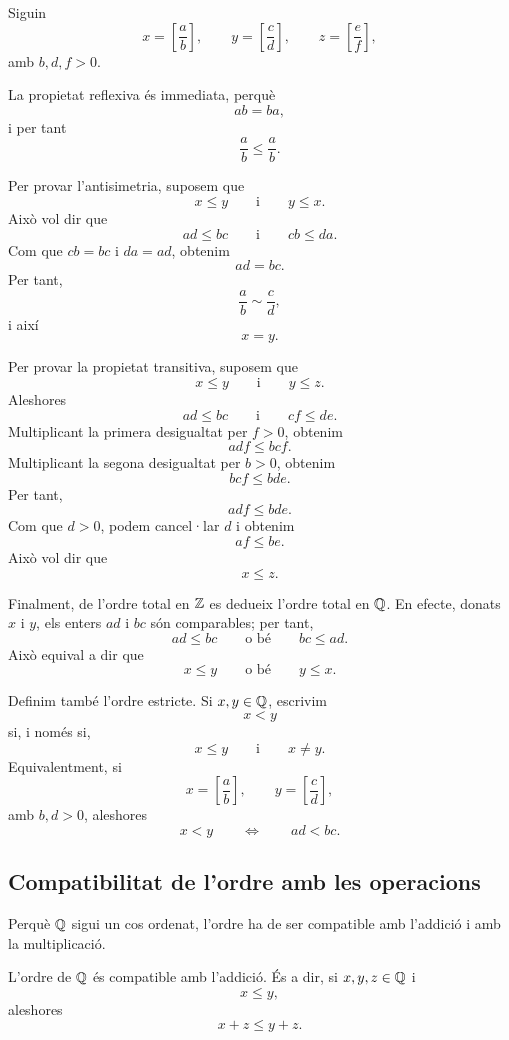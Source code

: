 \begin{prova}
Siguin
\[
	x=\left[\frac{a}{b}\right],
	\qquad
	y=\left[\frac{c}{d}\right],
	\qquad
	z=\left[\frac{e}{f}\right],
\]
amb \(b,d,f>0\).

La propietat reflexiva és immediata, perquè
\[
	ab=ba,
\]
i per tant
\[
	\frac{a}{b}\leq\frac{a}{b}.
\]

Per provar l'antisimetria, suposem que
\[
	x\leq y
	\qquad\text{i}\qquad
	y\leq x.
\]
Això vol dir que
\[
	ad\leq bc
	\qquad\text{i}\qquad
	cb\leq da.
\]
Com que \(cb=bc\) i \(da=ad\), obtenim
\[
	ad=bc.
\]
Per tant,
\[
	\frac{a}{b}\sim\frac{c}{d},
\]
i així
\[
	x=y.
\]

Per provar la propietat transitiva, suposem que
\[
	x\leq y
	\qquad\text{i}\qquad
	y\leq z.
\]
Aleshores
\[
	ad\leq bc
	\qquad\text{i}\qquad
	cf\leq de.
\]
Multiplicant la primera desigualtat per \(f>0\), obtenim
\[
	adf\leq bcf.
\]
Multiplicant la segona desigualtat per \(b>0\), obtenim
\[
	bcf\leq bde.
\]
Per tant,
\[
	adf\leq bde.
\]
Com que \(d>0\), podem cancel·lar \(d\) i obtenim
\[
	af\leq be.
\]
Això vol dir que
\[
	x\leq z.
\]

Finalment, de l'ordre total en \(\mathbb{Z}\) es dedueix l'ordre total en \(\mathbb{Q}\). En efecte, donats \(x\) i \(y\), els enters \(ad\) i \(bc\) són comparables; per tant,
\[
	ad\leq bc
	\qquad\text{o bé}\qquad
	bc\leq ad.
\]
Això equival a dir que
\[
	x\leq y
	\qquad\text{o bé}\qquad
	y\leq x.
\]
\end{prova}

Definim també l'ordre estricte. Si \(x,y\in\mathbb{Q}\), escrivim
\[
	x<y
\]
si, i només si,
\[
	x\leq y
	\qquad\text{i}\qquad
	x\neq y.
\]
Equivalentment, si
\[
	x=\left[\frac{a}{b}\right],
	\qquad
	y=\left[\frac{c}{d}\right],
\]
amb \(b,d>0\), aleshores
\[
	x<y
	\qquad\Longleftrightarrow\qquad
	ad<bc.
\]

\subsection{Compatibilitat de l'ordre amb les operacions}

Perquè \(\mathbb{Q}\) sigui un cos ordenat, l'ordre ha de ser compatible amb l'addició i amb la multiplicació.

\begin{proposicio}
L'ordre de \(\mathbb{Q}\) és compatible amb l'addició. És a dir, si \(x,y,z\in\mathbb{Q}\) i
\[
	x\leq y,
\]
aleshores
\[
	x+z\leq y+z.
\]
\end{proposicio}

